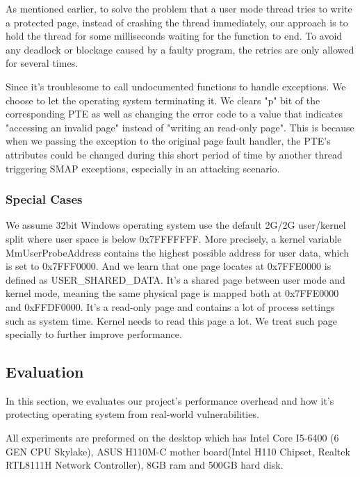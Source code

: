 As mentioned earlier, to solve the problem that a user mode thread tries to write a protected page, instead of crashing the thread immediately, our approach is to hold the thread for some milliseconds waiting for the function to end. To avoid any deadlock or blockage caused by a faulty program, the retries are only allowed for several times. 

Since it's troublesome to call undocumented functions to handle exceptions. We choose to let the operating system terminating it. We clears "p" bit of the corresponding PTE as well as changing the error code to a value that indicates "accessing an invalid page" instead of "writing an read-only page". This is because when we passing the exception to the original page fault handler, the PTE's attributes could be changed during this short period of time by another thread triggering SMAP exceptions, especially in an attacking scenario. 




\subsubsection{Special Cases}
We assume 32bit Windows operating system use the default 2G/2G user/kernel split where user space is below 0x7FFFFFFF. More precisely, a kernel variable MmUserProbeAddress contains the highest possible address for user data, which is set to 0x7FFF0000. And we learn that one page locates at 0x7FFE0000 is defined as USER_SHARED_DATA. It's a shared page between user mode and kernel mode, meaning the same physical page is mapped both at 0x7FFE0000 and 0xFFDF0000. It's a read-only page and contains a lot of process settings such as system time. Kernel needs to read this page a lot. We treat such page specially to further improve performance. 


\subsection{Evaluation}

In this section, we evaluates our project's performance overhead and how it's protecting operating system from real-world vulnerabilities.

All experiments are preformed on the desktop which has Intel Core I5-6400 (6 GEN CPU Skylake), ASUS H110M-C mother board(Intel H110 Chipset, Realtek RTL8111H Network Controller), 8GB ram and 500GB hard disk.


